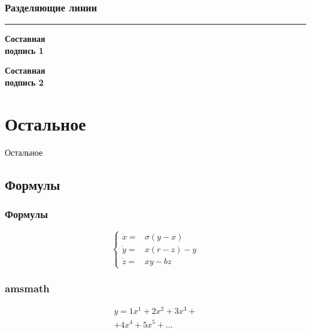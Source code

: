\begin{frame}
    \frametitle{Разделяющие линии}
    \begin{minipage}[c]{0.47\linewidth}
        \bigskip
        \hrule{}
        \bigskip
        \textbf{Составная \\ подпись 1}
    \end{minipage}
    \hfill
    \vrule{}
    \hfill
    \begin{minipage}[c]{0.47\linewidth}
        \flushright
        \textbf{Составная \\ подпись 2}
    \end{minipage}
\end{frame}

\section{Остальное}
\begin{frame}
    \begin{center}
        \Huge
        Остальное
    \end{center}
\end{frame}

\subsection{Формулы}

\begin{frame}
    \frametitle{Формулы}
    \[
    \left\{
    \begin{array}{rl}
        \dot x = & \sigma (y-x)  \\
        \dot y = & x (r - z) - y \\
        \dot z = & xy - bz
    \end{array}
    \right.
    \]
\end{frame}

\begin{frame}
    \frametitle{amsmath}
    \centering
    \begin{minipage}[t]{0.5\linewidth}
        \begin{multline*}
            y = 1 x^1 + 2 x^2 + 3 x^3 + \\ + 4 x^4 + 5 x^5 + \dots
        \end{multline*}
    \end{minipage}
\end{frame}

